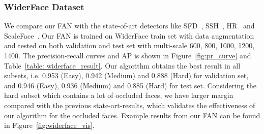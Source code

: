 \documentclass[10pt,twocolumn,letterpaper]{article}
\begin{document}
\subsubsection{WiderFace Dataset}

We compare our FAN with the state-of-art detectors like SFD~\cite{zhang2017s3fd}, SSH~\cite{najibi2017ssh}, HR~\cite{Hu_2017_CVPR} and ScaleFace~\cite{yang2017face}. Our FAN is trained on WiderFace train set with data augmentation and tested on both validation and test set with multi-scale {600, 800, 1000, 1200, 1400}. The precision-recall curves and AP is shown in Figure~\ref{fig:pr_curve} and Table~\ref{table: widerface_result}. Our algorithm obtains the best result in all subsets, i.e. 0.953 (Easy), 0.942 (Medium) and 0.888 (Hard) for validation set, and 0.946 (Easy), 0.936 (Medium) and 0.885 (Hard) for test set. Considering the hard subset which contains a lot of occluded faces, we have larger margin compared with the previous state-art-results, which validates the effectiveness of our algorithm for the occluded faces. Example results from our FAN can be found in Figure~\ref{fig:widerface_vis}.



\begin{table}[t]
\begin{center}
\end{center}
\caption{Comparison of FAN with state-of-art detectors on the test set of the WiderFace dataset.}
\label{table: widerface_result}
\end{table}
\end{document}
